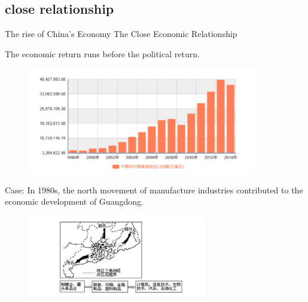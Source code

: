 \documentclass[slidestop,uncompress,mathsans, 12pt]{beamer}
\begin{document}
\subsection{close relationship}
\begin{frame}{The rise of China's Economy}
The Close Economic Relationship\\
\bigskip
\begin{overprint}
The economic return runs before the political return.\\
\begin{figure}[h!]
\centering
\includegraphics[width=0.9\textwidth]{hk6.jpg}
\label{threadsVsSync}
\end{figure}
Case: In 1980s,  the north movement of manufacture industries contributed to the economic development of Guangdong.\\ 
\begin{figure}[h!]
\centering
\includegraphics[width=0.7\textwidth]{hk7.jpg}
\label{threadsVsSync}
\end{figure}
\end{overprint}
\end{frame}
\end{document}

